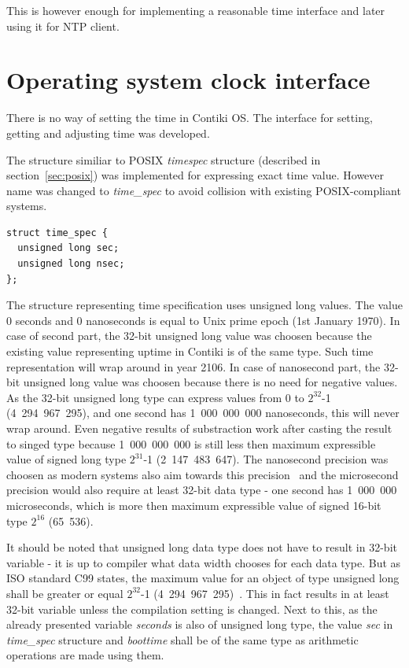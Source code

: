 
This is however enough for implementing a reasonable time interface and later using it for NTP client.



\section{Operating system clock interface}
There is no way of setting the time in Contiki OS.
The interface for setting, getting and adjusting time was developed.

The structure similiar to POSIX {\it{timespec}} structure (described in section~\ref{sec:posix})
was implemented for expressing exact time value.
However name was changed to {\it{time\_spec}} to avoid collision with existing POSIX-compliant systems.
\begin{lstlisting}
struct time_spec {
  unsigned long sec;
  unsigned long nsec;
};
\end{lstlisting}
The structure representing time specification uses unsigned long values.
The value 0 seconds and 0 nanoseconds is equal to Unix prime epoch (1st January 1970).
In case of second part, the 32-bit unsigned long value was choosen because the existing value
representing uptime in Contiki is of the same type.
Such time representation will wrap around in year 2106.
In case of nanosecond part, the 32-bit unsigned long value was choosen because there is no need
for negative values.
As the 32-bit unsigned long type can express values from 0 to $2^{32}$-1 (4~294~967~295),
and one second has 1~000~000~000 nanoseconds, this will never wrap around.
Even negative results of substraction work after casting the result to singed type
because 1~000~000~000 is still less then maximum expressible value of signed long type $2^{31}$-1 (2~147~483~647).
The nanosecond precision was choosen as modern systems also aim towards this precision~\cite{posix,ntp-precision} and
the microsecond precision would also require at least 32-bit data type -
one second has 1~000~000 microseconds, which is more then maximum expressible value of signed 16-bit
type $2^{16}$ (65~536).

It should be noted that unsigned long data type does not have to result in 32-bit variable -
it is up to compiler what data width chooses for each data type.
But as ISO standard C99 states, the maximum value for an object of type unsigned long
shall be greater or equal $2^{32}$-1 (4~294~967~295)~\cite{c99}.
This in fact results in at least 32-bit variable unless the compilation setting is changed.
Next to this, as the already presented variable {\it{seconds}} is also of unsigned long type,
the value {\it{sec}} in {\it{time\_spec}} structure and {\it{boottime}}
shall be of the same type as arithmetic operations are made using them.


